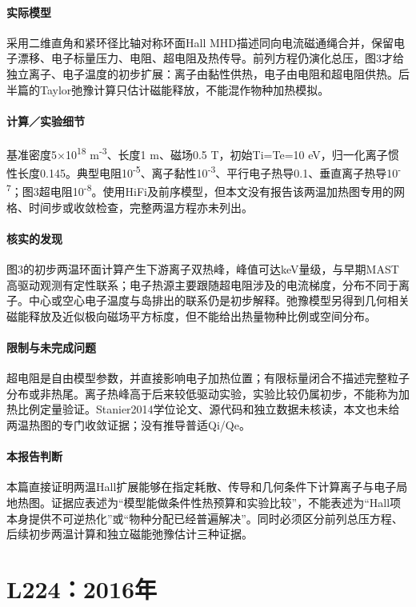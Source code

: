\paragraph{实际模型}采用二维直角和紧环径比轴对称环面Hall MHD描述同向电流磁通绳合并，保留电子漂移、电子标量压力、电阻、超电阻及热传导。前列方程仍演化总压，图3才给独立离子、电子温度的初步扩展：离子由黏性供热，电子由电阻和超电阻供热。后半篇的Taylor弛豫计算只估计磁能释放，不能混作物种加热模拟。

\paragraph{计算／实验细节}基准密度5×10\textsuperscript{18} m\textsuperscript{-3}、长度1 m、磁场0.5 T，初始Ti=Te=10 eV，归一化离子惯性长度0.145。典型电阻10\textsuperscript{-5}、离子黏性10\textsuperscript{-3}、平行电子热导0.1、垂直离子热导10\textsuperscript{-7}；图3超电阻10\textsuperscript{-8}。使用HiFi及前序模型，但本文没有报告该两温加热图专用的网格、时间步或收敛检查，完整两温方程亦未列出。

\paragraph{核实的发现}图3的初步两温环面计算产生下游离子双热峰，峰值可达keV量级，与早期MAST高驱动观测有定性联系；电子热源主要跟随超电阻涉及的电流梯度，分布不同于离子。中心或空心电子温度与岛排出的联系仍是初步解释。弛豫模型另得到几何相关磁能释放及近似极向磁场平方标度，但不能给出热量物种比例或空间分布。

\paragraph{限制与未完成问题}超电阻是自由模型参数，并直接影响电子加热位置；有限标量闭合不描述完整粒子分布或非热尾。离子热峰高于后来较低驱动实验，实验比较仍属初步，不能称为加热比例定量验证。Stanier2014学位论文、源代码和独立数据未核读，本文也未给两温热图的专门收敛证据；没有推导普适Qi/Qe。

\paragraph{本报告判断}本篇直接证明两温Hall扩展能够在指定耗散、传导和几何条件下计算离子与电子局地热图。证据应表述为“模型能做条件性热预算和实验比较”，不能表述为“Hall项本身提供不可逆热化”或“物种分配已经普遍解决”。同时必须区分前列总压方程、后续初步两温计算和独立磁能弛豫估计三种证据。

\section{L224：2016年}\label{paper:L224}

